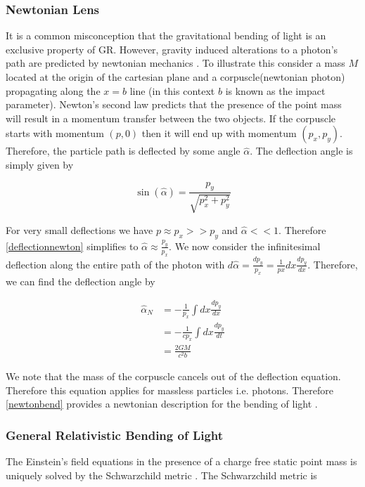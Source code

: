 \subsubsection{Newtonian Lens}
\label{subsec:newtonlens}

It is a common misconception that the gravitational bending of light is an exclusive property of GR.
However, gravity induced alterations to a photon's path are predicted by newtonian mechanics \cite{lensingbook}. To illustrate this 
consider a mass $M$ located at the origin of the cartesian plane and a corpuscle(newtonian photon) 
propagating along the $x=b$ line (in this context $b$ is known as the impact parameter). 
Newton's second law predicts that the presence of the point mass will result in a momentum transfer
between the two objects. If the corpuscle starts with 
momentum $(p,0)$ then it will end up with momentum $(p_x,p_y)$.
Therefore, the particle path is deflected by some angle $\hat{\alpha}$. The deflection angle is 
simply given by 

\begin{equation}
  \sin(\hat{\alpha}) = \frac{p_y}{\sqrt{p_x^2+p_y^2}}
  \label{deflectionnewton}
\end{equation}


\par For very small deflections we have $p\approx p_x >> p_y$ and $\hat{\alpha} << 1$. 
Therefore \autoref{deflectionnewton} simplifies to $\hat{\alpha}
\approx \frac{p_y}{p_x}$. We now consider the infinitesimal deflection along the entire path of the photon with
$d\hat{\alpha} = \frac{dp_y}{p_x} = \frac{1}{px} dx \frac{dp_y}{dx}$. Therefore, we can find the deflection
angle by 

\begin{equation}
  \begin{split}
  \hat{\alpha}_N &= -\frac{1}{p_x} \int dx \frac{dp_y}{dx} \\
  &= -\frac{1}{cp_x} \int dx \frac{dp_y}{dt}  \\ 
  &= \frac{2GM}{c^2b}
  \end{split}  
  \label{newtonbend}
\end{equation}

We note that the mass of the corpuscle cancels out of the deflection equation. Therefore this equation applies
for massless particles i.e. photons. Therefore \autoref{newtonbend} provides a newtonian description for the 
bending of light \cite{lensingbook}.

\subsubsection{General Relativistic Bending of Light}
The Einstein's field equations in the presence of a charge free static point mass is uniquely solved by 
the Schwarzchild metric \cite{GR1}. The Schwarzchild metric is

